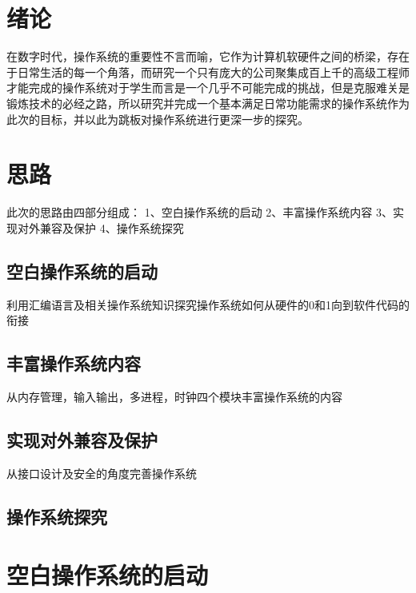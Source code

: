 \documentclass{swfcthesis}
\begin{document}

\makepreliminarypages%
\frontmatter          
\tableofcontents     %
\listoffigures       %
\listoftables        %
\mainmatter
\chapter{绪论}
在数字时代，操作系统的重要性不言而喻，它作为计算机软硬件之间的桥梁，存在于日常生活的每一个角落，而研究一个只有庞大的公司聚集成百上千的高级工程师才能完成的操作系统对于学生而言是一个几乎不可能完成的挑战，但是克服难关是锻炼技术的必经之路\cite{30_os}，所以研究并完成一个基本满足日常功能需求的操作系统作为此次的目标，并以此为跳板对操作系统进行更深一步的探究。
\chapter{思路}
此次的思路由四部分组成：
1、空白操作系统的启动
2、丰富操作系统内容
3、实现对外兼容及保护
4、操作系统探究
\section{空白操作系统的启动}
利用汇编语言及相关操作系统知识探究操作系统如何从硬件的0和1向到软件代码的衔接
\section{丰富操作系统内容}
从内存管理，输入输出，多进程，时钟四个模块丰富操作系统的内容
\section{实现对外兼容及保护}
从接口设计及安全的角度完善操作系统
\section{操作系统探究}

\chapter{空白操作系统的启动}
\end{document}
